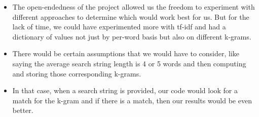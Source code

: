 \documentclass[11pt]{article}
\begin{document}
\begin{itemize}
	\item The open-endedness of the project allowed us the freedom to experiment with different approaches to determine which would work best for us. But for the lack of time, we could have experimented more with tf-idf and had a dictionary of values not just by per-word basis but also on different k-grams.
	
	\item There would be certain assumptions that we would have to consider, like saying the average search string length is 4 or 5 words and then computing and storing those corresponding k-grams.
	
	\item In that case, when a search string is provided, our code would look for a match for the k-gram and if there is a match, then our results would be even better. 
\end{itemize}
\end{document}
